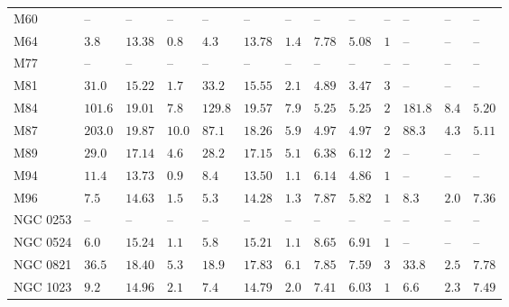 \begin{table*}
\begin{center}
\begin{tabular}{lllllllllllll}
M60  \quad &   -- &   -- &   -- \quad \quad &   -- &   -- &   -- &   -- &   -- \quad \quad & 
 -- \quad \quad & 
 -- &   -- &   --    \\ 
M64  \quad &  $3.8$  &  $13.38$  &  $0.8$  \quad \quad &  $4.3$  &  $13.78$  &  $1.4$  &  $7.78$  &  $5.08$  \quad \quad &  $1$  \quad \quad &   -- &   -- &   --    \\ 
M77  \quad &   -- &   -- &   -- \quad \quad &   -- &   -- &   -- &   -- &   -- \quad \quad & 
 -- \quad \quad & 
 -- &   -- &   --    \\ 
M81  \quad &  $31.0$  &  $15.22$  &  $1.7$  \quad \quad &  $33.2$  &  $15.55$  &  $2.1$  &  $4.89$  &  $3.47$  \quad \quad &  $3$  \quad \quad &   -- &   -- &   --    \\ 
M84  \quad &  $101.6$  &  $19.01$  &  $7.8$  \quad \quad &  $129.8$  &  $19.57$  &  $7.9$  &  $5.25$  &  $5.25$  \quad \quad &  $2$  \quad \quad &  $181.8$  &  $8.4$  &  $5.20$  \\ 
M87  \quad &  $203.0$  &  $19.87$  &  $10.0$  \quad \quad &  $87.1$  &  $18.26$  &  $5.9$  &  $4.97$  &  $4.97$  \quad \quad &  $2$  \quad \quad &  $88.3$  &  $4.3$  &  $5.11$  \\ 
M89  \quad &  $29.0$  &  $17.14$  &  $4.6$  \quad \quad &  $28.2$  &  $17.15$  &  $5.1$  &  $6.38$  &  $6.12$  \quad \quad &  $2$  \quad \quad &   -- &   -- &   --    \\ 
M94  \quad &  $11.4$  &  $13.73$  &  $0.9$  \quad \quad &  $8.4$  &  $13.50$  &  $1.1$  &  $6.14$  &  $4.86$  \quad \quad &  $1$  \quad \quad &   -- &   -- &   --    \\ 
M96  \quad &  $7.5$  &  $14.63$  &  $1.5$  \quad \quad &  $5.3$  &  $14.28$  &  $1.3$  &  $7.87$  &  $5.82$  \quad \quad &  $1$  \quad \quad &  $8.3$  &  $2.0$  &   $7.36$    \\ 
NGC 0253  \quad &   -- &   -- &   -- \quad \quad &   -- &   -- &   -- &   -- &   -- \quad \quad & 
 -- \quad \quad & 
 -- &   -- &   --    \\ 
NGC 0524  \quad &  $6.0$  &  $15.24$  &  $1.1$  \quad \quad &  $5.8$  &  $15.21$  &  $1.1$  &  $8.65$  &  $6.91$  \quad \quad &  $1$  \quad \quad &   -- &   -- &   --    \\ 
NGC 0821  \quad &  $36.5$  &  $18.40$  &  $5.3$  \quad \quad &  $18.9$  &  $17.83$  &  $6.1$  &  $7.85$  &  $7.59$  \quad \quad &  $3$  \quad \quad &  $33.8$  &  $2.5$  &  $7.78$  \\ 
NGC 1023  \quad &  $9.2$  &  $14.96$  &  $2.1$  \quad \quad &  $7.4$  &  $14.79$  &  $2.0$  &  $7.41$  &  $6.03$  \quad \quad &  $1$  \quad \quad &  $6.6$  &  $2.3$  &  $7.49$  \\ 

\end{tabular}
\end{center}
\end{table*}
